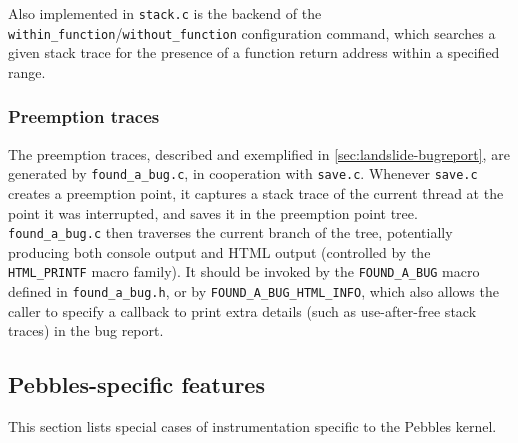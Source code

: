 Also implemented in {\tt stack.c} is the backend of the {\tt within\_function}/{\tt without\_function} configuration command,
which searches a given stack trace for the presence of a function return address within a specified range.

\subsubsection{Preemption traces}

The preemption traces, described and exemplified in \cref{sec:landslide-bugreport}, are generated by {\tt found\_a\_\allowbreak{}bug.c},
in cooperation with {\tt save.c}.
Whenever {\tt save.c} creates a preemption point, it captures a stack trace of the current thread at the point it was interrupted, and saves it in the preemption point tree.
{\tt found\_a\_bug.c} then traverses the current branch of the tree,
potentially producing both console output and HTML output (controlled by the {\tt HTML\_PRINTF} macro family).
It should be invoked by the {\tt FOUND\_A\_BUG} macro defined in {\tt found\_a\_bug.h},
or by {\tt FOUND\_A\_BUG\_HTML\_INFO}, which also allows the caller to specify a callback to print extra details (such as use-after-free stack traces) in the bug report.


\subsection{Pebbles-specific features}
\label{sec:landslide-pebblesspecifics}

This section lists special cases of instrumentation specific to the Pebbles kernel.

